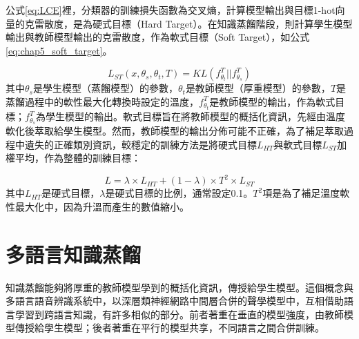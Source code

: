公式\ref{eq:LCE}裡，分類器的訓練損失函數為交叉熵，計算模型輸出與目標1-hot向量的克雷散度，是為硬式目標（Hard Target）。在知識蒸餾階段，則計算學生模型輸出與教師模型輸出的克雷散度，作為軟式目標（Soft Target），如公式\ref{eq:chap5_soft_target}。

\begin{equation} \label{eq:chap5_soft_target}
L_{ST}(x, \theta_{s} , \theta_{t} , T ) = KL( f_{\theta_{t} }^{T} || f_{\theta_{s}}^{T} )
\end{equation}
其中$\theta_{s}$是學生模型（蒸餾模型）的參數，$\theta_{t}$是教師模型（厚重模型）的參數，$T$是蒸餾過程中的軟性最大化轉換時設定的溫度，$f_{\theta_{t} }^{T}$是教師模型的輸出，作為軟式目標；$f_{\theta_{s} }^{T}$為學生模型的輸出。軟式目標旨在將教師模型的概括化資訊，先經由溫度軟化後萃取給學生模型。然而，教師模型的輸出分佈可能不正確，為了補足萃取過程中遺失的正確類別資訊，較穩定的訓練方法是將硬式目標$L_{HT}$與軟式目標$L_{ST}$加權平均，作為整體的訓練目標：

\begin{equation}
L = \lambda \times L_{HT} + (1-\lambda) \times T^2 \times L_{ST}
\end{equation}
其中$L_{HT}$是硬式目標，$\lambda$是硬式目標的比例，通常設定0.1。$T^2$項是為了補足溫度軟性最大化中，因為升溫而產生的數值縮小。

\section{多語言知識蒸餾}


知識蒸餾能夠將厚重的教師模型學到的概括化資訊，傳授給學生模型。這個概念與多語言語音辨識系統中，以深層類神經網路中間層合併的聲學模型中，互相借助語言學習到跨語言知識，有許多相似的部分。前者著重在垂直的模型強度，由教師模型傳授給學生模型；後者著重在平行的模型共享，不同語言之間合併訓練。

